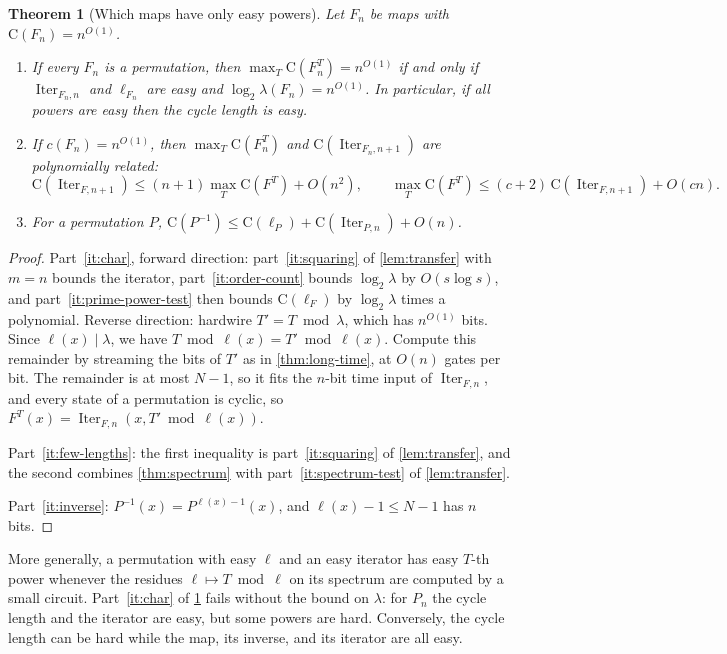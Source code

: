 \documentclass[11pt]{article}
\newtheorem{theorem}{Theorem}[section]
\theoremstyle{definition}
\theoremstyle{remark}
\newcommand{\CC}{\mathrm{C}}
\newcommand{\Iter}{\operatorname{Iter}}
\numberwithin{equation}{section}
\begin{document}
\begin{theorem}[Which maps have only easy powers]\label{thm:easy-powers}
Let $F_n$ be maps with $\CC(F_n)=n^{O(1)}$.
\begin{enumerate}
\item\label{it:char} If every $F_n$ is a permutation, then
 $\max_T\CC(F_n^T)=n^{O(1)}$ if and only if $\Iter_{F_n,n}$ and
 $\ell_{F_n}$ are easy and $\log_2\lambda(F_n)=n^{O(1)}$.  In particular,
 if all powers are easy then the cycle length is easy.
\item\label{it:few-lengths} If $c(F_n)=n^{O(1)}$, then
 $\max_T\CC(F_n^T)$ and $\CC(\Iter_{F_n,n+1})$ are polynomially related:
 \[
  \CC(\Iter_{F,n+1})\leq(n+1)\max_T\CC(F^T)+O(n^2),\qquad
  \max_T\CC(F^T)\leq(c+2)\,\CC(\Iter_{F,n+1})+O(cn).
 \]
\item\label{it:inverse} For a permutation $P$,
 $\CC(P^{-1})\leq\CC(\ell_P)+\CC(\Iter_{P,n})+O(n)$.
\end{enumerate}
\end{theorem}
\begin{proof}
Part~\ref{it:char}, forward direction: part~\ref{it:squaring} of \cref{lem:transfer} with $m=n$ bounds the iterator, part~\ref{it:order-count}
bounds $\log_2\lambda$ by $O(s\log s)$, and part~\ref{it:prime-power-test}
then bounds $\CC(\ell_F)$ by $\log_2\lambda$ times a polynomial.  Reverse
direction: hardwire $T'=T\bmod\lambda$, which has $n^{O(1)}$ bits.  Since
$\ell(x)\mid\lambda$, we have $T\bmod\ell(x)=T'\bmod\ell(x)$.  Compute this
remainder by streaming the bits of $T'$ as in \cref{thm:long-time}, at
$O(n)$ gates per bit.  The remainder is at most $N-1$, so it fits the
$n$-bit time input of $\Iter_{F,n}$, and every state of a permutation is
cyclic, so $F^T(x)=\Iter_{F,n}(x,T'\bmod\ell(x))$.

Part~\ref{it:few-lengths}: the first inequality is
part~\ref{it:squaring} of \cref{lem:transfer}, and the second combines
\cref{thm:spectrum} with part~\ref{it:spectrum-test} of \cref{lem:transfer}.

Part~\ref{it:inverse}: $P^{-1}(x)=P^{\ell(x)-1}(x)$, and $\ell(x)-1\leq N-1$
has $n$ bits.
\end{proof}

More generally, a permutation with easy $\ell$ and an easy iterator has
easy $T$-th power whenever the residues $\ell\mapsto T\bmod\ell$ on its
spectrum are computed by a small circuit.  Part~\ref{it:char} of \cref{thm:easy-powers} fails without the bound on $\lambda$: for $P_n$ the cycle
length and the iterator are easy, but some powers are hard.  Conversely,
the cycle length can be hard while the map, its inverse, and its iterator
are all easy.
\end{document}
